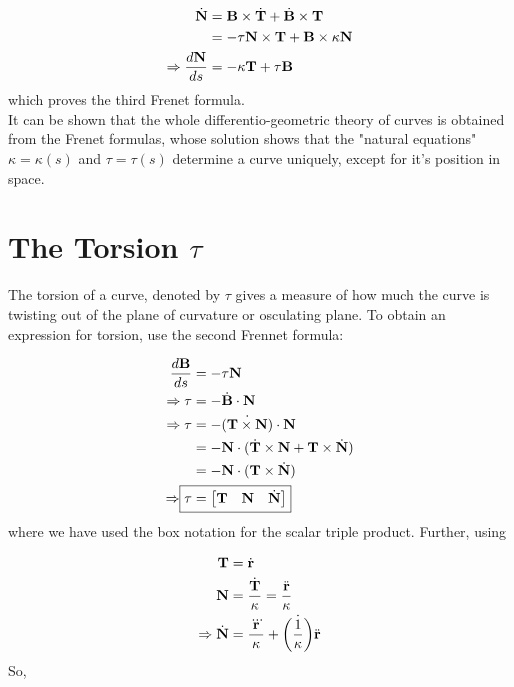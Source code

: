 \documentclass{article}
\begin{document}
\begin{flushleft}
	\begin{align*}
	\dot{\mathbf{N}} &= \mathbf{B} \times \dot{\mathbf{T}} + \dot{\mathbf{B}} \times \mathbf{T}\\
	&= -\tau \mathbf{N} \times \mathbf{T} + \mathbf{B} \times \kappa \mathbf{N}\\
	\Rightarrow  \frac{d\mathbf{N}}{ds} &= -\kappa\mathbf{T} + \tau\mathbf{B}
	\end{align*}
	which proves the third Frenet formula.\\
	It can be shown that the whole differentio-geometric theory of curves is obtained from the Frenet formulas, whose solution shows that the "natural
	equations" $\kappa = \kappa(s)$ and $\tau = \tau(s)$ determine a curve uniquely, except for it's position in space.
	
	
	\color{blue}
	\section{The Torsion $\tau$}
	\color{black}
	
	The torsion of a curve, denoted by $\tau$ gives a measure of how much the curve is twisting out of the plane of curvature or osculating plane. To obtain
	an expression for torsion, use the second Frennet formula:
	
	\begin{align*}
	    \frac{d\vect{B}}{ds} &= -\tau \vect{N} \\
		\Rightarrow \tau &= -\VectDiff{B}\cdot \vect{N}\\
		\Rightarrow \tau&= -\dot{(\vect{T} \times \vect{N})} \cdot \vect{N}\\
		&= -\vect{N} \cdot (\VectDiff{T} \times \vect{N} + \vect{T} \times \VectDiff{N})\\
		&= -\vect{N} \cdot (\vect{T} \times \VectDiff{N}) \\
		\Rightarrow  \Aboxed{\tau &= {\begin{bmatrix}
			\vect{T} & \vect{N} & \VectDiff{N}
		\end{bmatrix}}}
	\end{align*}
	where we have used the box notation for the scalar triple product. Further, using
	
	\begin{align*}
		\mathbf{T} &= \dot{\mathbf{r}} \\
		\mathbf{N} &= \frac{\dot{\mathbf{T}}}{\kappa} = \frac{\ddot{\mathbf{r}}}{\kappa}\\
		\Rightarrow \dot{\mathbf{N}} &= \frac{\dddot{\mathbf{r}}}{\kappa} + \dot{\left(\frac{1}{\kappa}\right)}\ddot{\mathbf{r}}
	\end{align*}
	So,
	

\end{flushleft}
\end{document}
